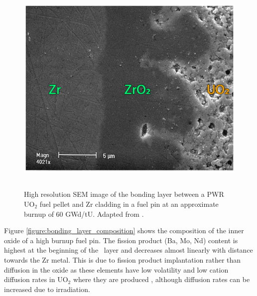 \begin{figure}[ht] %
\centering
\includegraphics[height=10.5cm]{images/pci_bondinglayer.png}
\caption[High resolution scanning electron microscrope (SEM) image of the bonding layer between a PWR UO$_{2}$ fuel pellet and Zr cladding in a fuel pin at an approximate burnup of 60 GWd/tU.]{High resolution SEM image of the bonding layer between a PWR UO$_{2}$ fuel pellet and Zr cladding in a fuel pin at an approximate burnup of 60 GWd/tU. Adapted from \cite{Lozano1998}.}
\label{figure:inner_oxide}
\end{figure}

Figure \ref{figure:bonding_layer_composition} shows the composition of the inner oxide of a high burnup fuel pin. The fission product (Ba, Mo, Nd) content is highest at the beginning of the \zirconia\ layer and decreases almost linearly with distance towards the Zr metal. This is due to fission product implantation rather than diffusion in the oxide as these elements have low volatility and low cation diffusion rates in UO$_{2}$ where they are produced \cite{S.G.PrussinD.R.OlanderP.Goubeault1984, Prussin1988}, although diffusion rates can be increased due to irradiation. %

